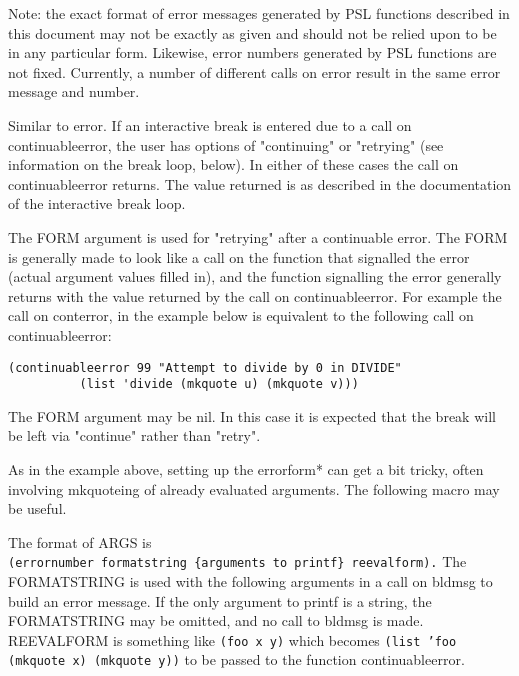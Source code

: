     Note:  the  exact  format of error messages generated by PSL
    functions described in this document may not be  exactly  as
    given  and should not be relied upon to be in any particular
    form.  Likewise, error numbers generated  by  PSL  functions
    are  not  fixed.   Currently, a number of different calls on
    error result in the same error message and number.


{   Similar to error.  If an interactive break is entered due to
    a  call  on  continuableerror,  the  user  has  options   of
    "continuing"  or  "retrying"  (see  information on the break
    loop, below).    In  either  of  these  cases  the  call  on
    continuableerror   returns.     The  value  returned  is  as
    described in the  documentation  of  the  interactive  break
    loop.  }
    
    The FORM argument is used for "retrying" after a continuable
    error.    The  FORM is generally made to look like a call on
    the function  that  signalled  the  error  (actual  argument
    values  filled  in),  and  the function signalling the error
    generally returns with the value returned  by  the  call  on
    continuableerror.  For example the call on conterror, in the
    example  below  is  equivalent  to  the  following  call  on
    continuableerror:
\begin{verbatim}
(continuableerror 99 "Attempt to divide by 0 in DIVIDE"
          (list 'divide (mkquote u) (mkquote v)))
\end{verbatim}
    The FORM argument may be nil.  In this case it  is  expected
    that  the  break  will  be  left  via "continue" rather than
    "retry".

    As in the example above, setting up the errorform* can get a
    bit tricky, often involving mkquoteing of already  evaluated
    arguments.  The following macro may be useful.

{The format of ARGS is \\
{\tt (errornumber formatstring \{arguments to printf\} reevalform).}
}
    The FORMATSTRING  is used with the following arguments in a
    call on bldmsg to build an  error  message.    If  the  only
    argument  to  printf  is  a  string, the FORMATSTRING may be
    omitted, and no call to  bldmsg  is  made.    REEVALFORM  is
    something like
    {\tt (foo x y)}
    which becomes
    {\tt (list 'foo (mkquote x) (mkquote y))}
    to be passed to the function continuableerror.

